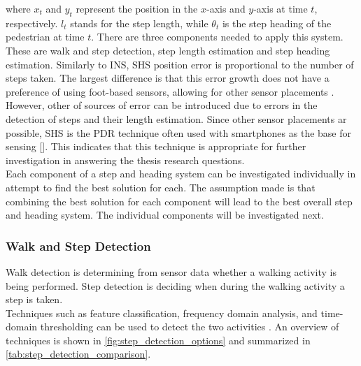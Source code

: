 where $x_{t}$  and  $y_{t}$ represent the position in the $x$-axis and $y$-axis at time  $t$, respectively. $l_{t}$ stands for the step length, while $\theta_{t}$ is the step heading of the pedestrian at time $t$.
There are three components needed to apply this system. These are walk and step detection, step length estimation and step heading estimation.
Similarly to INS, SHS position error is proportional to the number of steps taken. The largest difference is that this error growth does not have a preference of using foot-based sensors, allowing for other sensor placements \cite{Diez2018b}. However, other of sources of error can be introduced due to errors in the detection of steps and their length estimation.  Since other sensor placements ar possible, SHS is the PDR technique often used with smartphones as the base for sensing [\qn]. This indicates that this technique is appropriate for further investigation in answering the thesis research questions.\\
Each component of a step and heading system can be investigated individually in attempt to find the best solution for each. The assumption made is that combining the best solution for each component will lead to the best overall step and heading system. The individual components will be investigated next.

\subsubsection{Walk and Step Detection}
\label{sec:rw - step detection}
Walk detection is determining from sensor data whether a walking activity is being performed. Step detection is deciding when during the walking activity a step is taken. \\
Techniques such as feature classification, frequency domain analysis, and time-domain thresholding can be used to detect the two activities \cite{Yang2014}. An overview of techniques  is  shown in \cref{fig:step_detection_options} and summarized in \cref{tab:step_detection_comparison}. %

